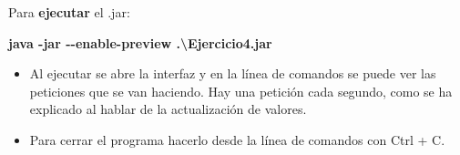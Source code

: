 \documentclass[
]{article}
\begin{document}
Para \textbf{ejecutar} el .jar:

\textbf{java -jar -\/-enable-preview .\textbackslash Ejercicio4.jar}

\begin{itemize}
\item
  Al ejecutar se abre la interfaz y en la línea de comandos se puede ver
  las peticiones que se van haciendo. Hay una petición cada segundo,
  como se ha explicado al hablar de la actualización de valores.
\item
  Para cerrar el programa hacerlo desde la línea de comandos con Ctrl +
  C.
\end{itemize}
\end{document}
